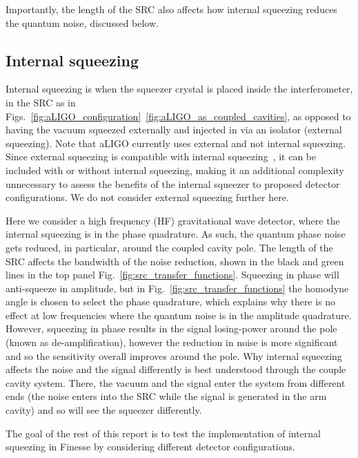\documentclass[aps,pra,superscriptaddress,reprint,nofootinbib]{revtex4-1}
\begin{document}
Importantly, the length of the SRC also affects how internal squeezing reduces the quantum noise, discussed below.

\subsection{Internal squeezing}
\label{sec:internal_squeezing}

Internal squeezing is when the squeezer crystal is placed inside the interferometer, in the SRC as in Figs.~\ref{fig:aLIGO_configuration}~\ref{fig:aLIGO_as_coupled_cavities}, as opposed to having the vacuum squeezed externally and injected in via an isolator (external squeezing). Note that aLIGO currently uses external and not internal squeezing. Since external squeezing is compatible with internal squeezing~\cite{Adya_2020,Korobko_2019}, it can be included with or without internal squeezing, making it an additional complexity unnecessary to assess the benefits of the internal squeezer to proposed detector configurations. We do not consider external squeezing further here.


Here we consider a high frequency (HF) gravitational wave detector, where the internal squeezing is in the phase quadrature. As such, the quantum phase noise gets reduced, in particular, around the coupled cavity pole. The length of the SRC affects the bandwidth of the noise reduction, shown in the black and green lines in the top panel Fig.~\ref{fig:src_transfer_functions}.
Squeezing in phase will anti-squeeze in amplitude, but in Fig.~\ref{fig:src_transfer_functions} the homodyne angle is chosen to select the phase quadrature, which explains why there is no effect at low frequencies where the quantum noise is in the amplitude quadrature. 
However, squeezing in phase results in the signal losing-power around the pole (known as de-amplification), however the reduction in noise is more significant and so the sensitivity overall improves around the pole.
Why internal squeezing affects the noise and the signal differently is best understood through the couple cavity system. There, the vacuum and the signal enter the system from different ends (the noise enters into the SRC while the signal is generated in the arm cavity) and so will see the squeezer differently.


The goal of the rest of this report is to test the implementation of internal squeezing in Finesse by considering different detector configurations.
\end{document}
